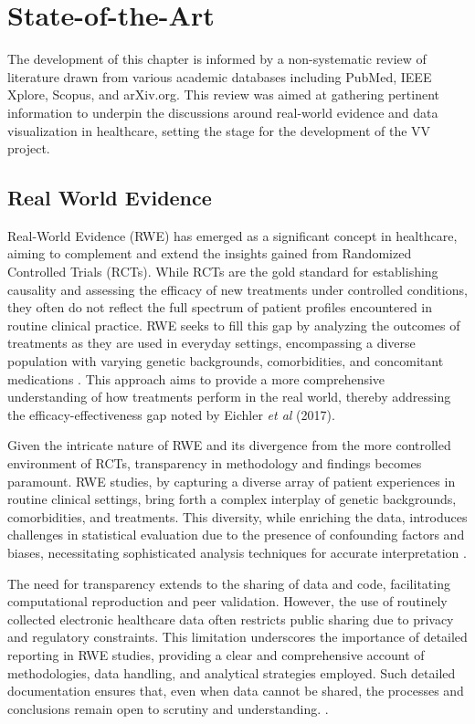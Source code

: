 \chapter{State-of-the-Art}\label{state-of-the-art}

\minitoc

The development of this chapter is informed by a non-systematic review of literature drawn from various academic databases including PubMed, IEEE Xplore, Scopus, and arXiv.org. This review was aimed at gathering pertinent information to underpin the discussions around real-world evidence and data visualization in healthcare, setting the stage for the development of the VV project.

\section{Real World Evidence}\label{real-world-evidence}

Real-World Evidence (RWE) has emerged as a significant concept in healthcare, aiming to complement and extend the insights gained from Randomized Controlled Trials (RCTs). While RCTs are the gold standard for establishing causality and assessing the efficacy of new treatments under controlled conditions, they often do not reflect the full spectrum of patient profiles encountered in routine clinical practice. RWE seeks to fill this gap by analyzing the outcomes of treatments as they are used in everyday settings, encompassing a diverse population with varying genetic backgrounds, comorbidities, and concomitant medications \cite{soa1}. This approach aims to provide a more comprehensive understanding of how treatments perform in the real world, thereby addressing the efficacy-effectiveness gap noted by Eichler \textit{et al} (2017)\cite{soa2}.

Given the intricate nature of RWE and its divergence from the more controlled environment of RCTs, transparency in methodology and findings becomes paramount. RWE studies, by capturing a diverse array of patient experiences in routine clinical settings, bring forth a complex interplay of genetic backgrounds, comorbidities, and treatments. This diversity, while enriching the data, introduces challenges in statistical evaluation due to the presence of confounding factors and biases, necessitating sophisticated analysis techniques for accurate interpretation \cite{soa3}\cite{soa4}.

The need for transparency extends to the sharing of data and code, facilitating computational reproduction and peer validation. However, the use of routinely collected electronic healthcare data often restricts public sharing due to privacy and regulatory constraints. This limitation underscores the importance of detailed reporting in RWE studies, providing a clear and comprehensive account of methodologies, data handling, and analytical strategies employed. Such detailed documentation ensures that, even when data cannot be shared, the processes and conclusions remain open to scrutiny and understanding. \cite{soa5}\cite{soa6}.

